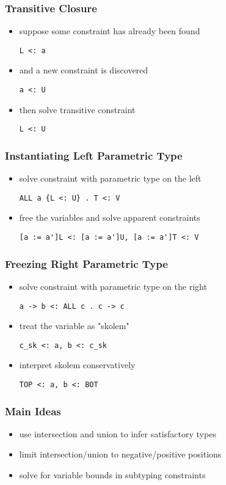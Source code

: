 \documentclass{beamer}
\begin{document}
\begin{frame}[fragile]
  \frametitle{Transitive Closure}

  \begin{itemize}
  \item suppose some constraint has already been found 
  \begin{lstlisting}
L <: a
  \end{lstlisting}
  \item and a new constraint is discovered 
  \begin{lstlisting}
a <: U 
  \end{lstlisting}
  \item then solve transitive constraint  
  \begin{lstlisting}
L <: U
  \end{lstlisting}
  \end{itemize}
\end{frame}

\begin{frame}[fragile]
  \frametitle{Instantiating Left Parametric Type}

  \begin{itemize}
  \item solve constraint with parametric type on the left 
  \begin{lstlisting}
ALL a {L <: U} . T <: V
  \end{lstlisting}
  \item free the variables and solve apparent constraints 
  \begin{lstlisting}
[a := a']L <: [a := a']U, [a := a']T <: V 
  \end{lstlisting}
  \end{itemize}
\end{frame}


\begin{frame}[fragile]
  \frametitle{Freezing Right Parametric Type}

  \begin{itemize}
  \item solve constraint with parametric type on the right 
  \begin{lstlisting}
a -> b <: ALL c . c -> c  
  \end{lstlisting}
  \item treat the variable as "skolem" 
  \begin{lstlisting}
c_sk <: a, b <: c_sk  
  \end{lstlisting}
  \item interpret skolem conservatively 
  \begin{lstlisting}
TOP <: a, b <: BOT  
  \end{lstlisting}
  \end{itemize}
\end{frame}

\begin{frame}[fragile]
  \frametitle{Main Ideas}

  \begin{itemize}
  \item use intersection and union to infer satisfactory types 
  \item limit intersection/union to negative/positive positions 
  \item solve for variable bounds in subtyping constraints  
  \end{itemize}
\end{frame}
\end{document}
